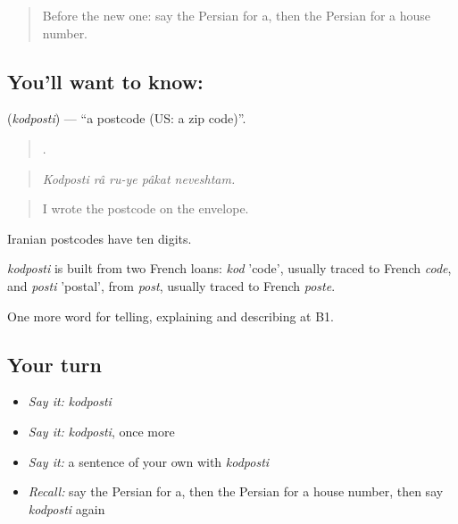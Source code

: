\begin{quote}
Before the new one: say the Persian for a, then the Persian for a house number.
\end{quote}

\subsection*{You'll want to know: }
\textbf{} (\emph{kodposti}) — \textquotedblleft{}a postcode (US: a zip code)\textquotedblright{}.

\begin{quote}
    .
\end{quote}

\begin{quote}
\emph{Kodposti râ ru-ye pâkat neveshtam.}
\end{quote}

\begin{quote}
I wrote the postcode on the envelope.
\end{quote}

Iranian postcodes have ten digits.

\begin{cousinweb}
\emph{kodposti} is built from two French loans: \emph{kod} 'code', usually traced to French \emph{code}, and \emph{posti} 'postal', from \emph{post}, usually traced to French \emph{poste}.
\end{cousinweb}

\begin{grammarlens}[title={What you've built}]
One more word for telling, explaining and describing at B1.
\end{grammarlens}

\subsection*{Your turn}
\begin{itemize}
\raggedright
  \item \emph{Say it:} \emph{kodposti}
  \item \emph{Say it:} \emph{kodposti}, once more
  \item \emph{Say it:} a sentence of your own with \emph{kodposti}
  \item \emph{Recall:} say the Persian for a, then the Persian for a house number, then say \emph{kodposti} again
\end{itemize}

